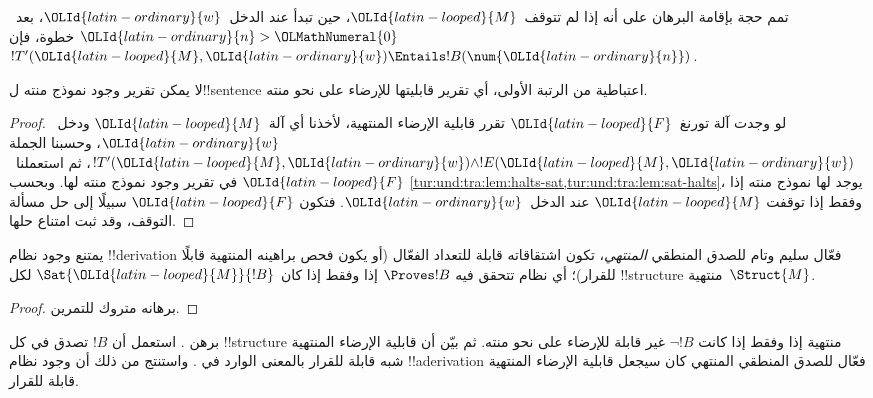 \documentclass[../../../include/open-logic-section]{subfiles}
\begin{document}
\begin{prob}
  تمم حجة  بإقامة البرهان على أنه إذا لم
  تتوقف~$\OLId{latin-looped}{M}$، حين تبدأ عند الدخل~$\OLId{latin-ordinary}{w}$، بعد~$\OLId{latin-ordinary}{n}>\OLMathNumeral{0}$ خطوة، فإن
  $!T'(\OLId{latin-looped}{M},\OLId{latin-ordinary}{w})\Entails !B(\num{\OLId{latin-ordinary}{n}})$.
\end{prob}

\begin{thm}
  لا يمكن تقرير وجود نموذج منته ل!!{sentence} اعتباطية من
  الرتبة الأولى، أي تقرير قابليتها للإرضاء على نحو منته.
\end{thm}

\begin{proof}
  لو وجدت آلة تورنغ~$\OLId{latin-looped}{F}$ تقرر قابلية الإرضاء المنتهية،
  لأخذنا أي آلة~$\OLId{latin-looped}{M}$ ودخل~$\OLId{latin-ordinary}{w}$، وحسبنا الجملة
  $!T'(\OLId{latin-looped}{M},\OLId{latin-ordinary}{w})\land !E(\OLId{latin-looped}{M},\OLId{latin-ordinary}{w})$، ثم استعملنا~$\OLId{latin-looped}{F}$ في تقرير
  وجود نموذج منته لها. وبحسب
  \cref{tur:und:tra:lem:halts-sat,tur:und:tra:lem:sat-halts}،
  يوجد لها نموذج منته إذا وفقط إذا توقفت $\OLId{latin-looped}{M}$ عند
  الدخل~$\OLId{latin-ordinary}{w}$. فتكون $\OLId{latin-looped}{F}$ سبيلًا إلى حل مسألة التوقف،
  وقد ثبت امتناع حلها.
\end{proof}

\begin{cor}%
  يمتنع وجود نظام !!{derivation} فعّال سليم وتام للصدق المنطقي
  \emph{المنتهي}، تكون اشتقاقاته قابلة للتعداد الفعّال (أو يكون فحص
  براهينه المنتهية قابلًا للقرار)؛ أي نظام تتحقق فيه $\Proves !B$ إذا وفقط
  إذا كان $\Sat{\OLId{latin-looped}{M}}{!B}$ لكل !!{structure} منتهية~$\Struct{M}$.
\end{cor}

\begin{proof}
  برهانه متروك للتمرين.
\end{proof}

\begin{prob}
  برهن . استعمل أن
  $!B$ تصدق في كل !!{structure} منتهية إذا وفقط إذا كانت
  $\lnot !B$ غير قابلة للإرضاء على نحو منته. ثم بيّن أن
  قابلية الإرضاء المنتهية شبه قابلة للقرار بالمعنى الوارد في
  . واستنتج من ذلك أن
  وجود نظام !!a{derivation} فعّال للصدق المنطقي المنتهي كان
  سيجعل قابلية الإرضاء المنتهية قابلة للقرار.
\end{prob}
\end{document}
